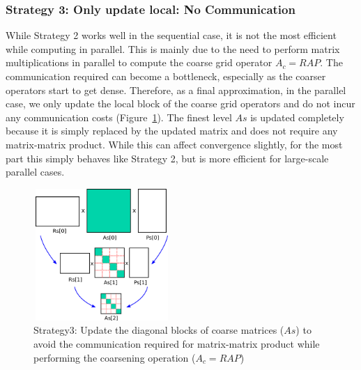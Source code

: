 
\subsubsection{Strategy 3: Only update local: No Communication}


While Strategy 2 works well in the sequential case, it is not the most efficient while computing in parallel.
This is mainly due to the need to perform matrix multiplications in parallel to compute the coarse
grid operator $A_c = RAP$. The communication required can become a bottleneck,
especially as the coarser operators start to get dense. Therefore, as a final approximation,
in the parallel case, we only update the local block of the coarse grid operators and do not incur
any communication costs (Figure~\ref{fig:str3}). The finest level $As$ is updated completely because it is simply replaced by
the updated matrix and does not require any matrix-matrix product. While this can affect convergence slightly, for the most part this simply
behaves like Strategy 2, but is more efficient for large-scale parallel cases.

\begin{figure}[ht]
 \centering
 \includegraphics[width=5.2cm,height=5cm]{./figures/strategy3.pdf}
 \caption{Strategy3: Update the diagonal blocks of coarse matrices ($As$) to avoid the communication required
          for matrix-matrix product while performing the coarsening operation ($A_c = RAP$)}
 \label{fig:str3}
\end{figure}
